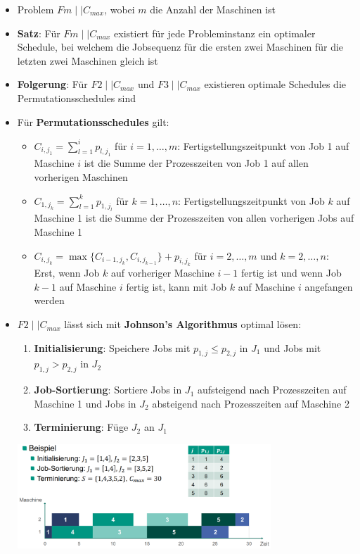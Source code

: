 \begin{itemize}
	\item Problem $Fm\mid\mid C_{max}$, wobei $m$ die Anzahl der Maschinen ist
	\item \textbf{Satz}: Für $Fm\mid\mid C_{max}$ existiert für jede Probleminstanz ein optimaler Schedule, bei welchem die Jobsequenz für die ersten zwei Maschinen für die letzten zwei Maschinen gleich ist
	\item \textbf{Folgerung}: Für $F2\mid\mid C_{max}$ und $F3\mid\mid C_{max}$ existieren optimale Schedules die Permutationsschedules sind
	\item Für \textbf{Permutationsschedules} gilt:
	\begin{itemize}
		\item $C_{i,j_1}=\sum\limits_{l=1}^{i}p_{l,j_1}$ für $i=1,\ldots,m$: Fertigstellungszeitpunkt von Job 1 auf Maschine $i$ ist die Summe der Prozesszeiten von Job 1 auf allen vorherigen Maschinen
		\item $C_{1,j_k}=\sum\limits_{l=1}^{k}p_{1,j_l}$ für $k=1,\ldots,n$:
		Fertigstellungszeitpunkt von Job $k$ auf Maschine 1 ist die Summe der Prozesszeiten von allen vorherigen Jobs auf Maschine 1
		\item $C_{i,j_k}=\max\{C_{i-1,j_k},C_{i,j_{k-1}}\}+p_{i,j_k}$ für $i=2,\ldots,m$ und $k=2,\ldots,n$:\\
		Erst, wenn Job $k$ auf vorheriger Maschine $i-1$ fertig ist und wenn Job $k-1$ auf Maschine $i$ fertig ist, kann mit Job $k$ auf Maschine $i$ angefangen werden
	\end{itemize}
	\item $F2\mid\mid C_{max}$ lässt sich mit \textbf{Johnson's Algorithmus} optimal lösen:
	\begin{enumerate}
		\item \textbf{Initialisierung}: Speichere Jobs mit $p_{1,j}\leq p_{2,j}$ in $J_1$ und Jobs mit $p_{1,j}>p_{2,j}$ in $J_2$
		\item \textbf{Job-Sortierung}: Sortiere Jobs in $J_1$ aufsteigend nach Prozesszeiten auf Maschine 1 und Jobs in $J_2$ absteigend nach Prozesszeiten auf Maschine 2
		\item \textbf{Terminierung}: Füge $J_2$ an $J_1$
	\end{enumerate}
	\begin{center}
		\includegraphics[width=0.75\textwidth]{images/johnson.png}
	\end{center}
\end{itemize}

